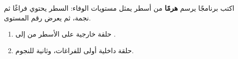 \begin{statement}
اكتب برنامجًا يرسم \textbf{هرمًا} من  أسطر يمثل مستويات الوفاء: السطر  يحتوي  فراغًا ثم  نجمة، ثم يعرض رقم المستوى.
\end{statement}
\begin{stepsbox}\begin{enumerate}
\item حلقة خارجية على الأسطر  من  إلى .
\item حلقة داخلية أولى للفراغات، وثانية للنجوم.
\end{enumerate}\end{stepsbox}
